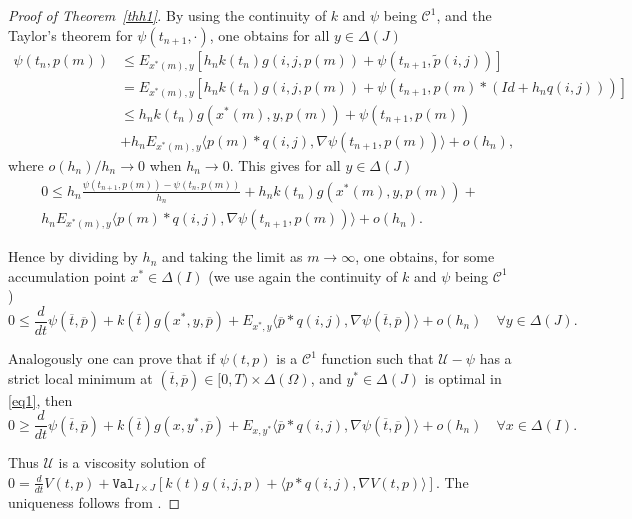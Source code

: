 \documentclass[english,openary,12pt]{article}
\theoremstyle{definition}
\begin{document}
\begin{proof}[Proof of Theorem~\ref{thh1}]
By using the continuity of $k$ and $\psi$ being $\mathcal C^1$, 
and the Taylor's theorem for $\psi(t_{n+1},\cdot)$, one obtains 
for all $y \in \Delta(J)$
\begin{align*}
\psi(t_n,p(m)) &\le E_{x^*(m),y} \left[h_n k(t_n) g(i,j,p(m)) + 
\psi(t_{n+1},\widetilde p(i,j))\right] \\
&= E_{x^*(m),y} \left[h_n k(t_n) g(i,j,p(m)) + 
\psi(t_{n+1},p(m) * (Id + h_n q(i,j)))\right] \\
&\le h_n k(t_n) g(x^*(m),y,p(m)) + \psi(t_{n+1},p(m)) \\
&+ h_n E_{x^*(m),y} \langle p(m) * q(i,j), 
\nabla \psi(t_{n+1},p(m)) \rangle + o(h_n),
\end{align*}
where $o(h_n) / h_n \to 0$ when $h_n \to 0$.
This gives for all $y \in \Delta(J)$\\
\begin{multline*}
  0 \le h_n \frac{\psi(t_{n+1},p(m)) - \psi(t_{n},p(m))}{h_n} 
  + h_n k(t_n) g(x^*(m),y,p(m)) + \\
  h_n E_{x^*(m),y} \langle p(m) * q(i,j), 
  \nabla \psi(t_{n+1},p(m)) \rangle + o(h_n).
\end{multline*}

Hence by dividing by $h_n$ and taking the limit as $m \to \infty$, 
one obtains, for some accumulation point $x^* \in \Delta(I)$ 
(we use again the continuity of $k$ and 
$\psi$ being $\mathcal C^1$)
$$0 \le \frac{d}{dt} \psi(\overline t,\overline p) + 
k(\overline t) g(x^*,y,\overline p) + 
E_{x^*,y} \langle \overline p * q(i,j), 
\nabla \psi(\overline t,\overline p) \rangle + o(h_n) \quad \forall y \in 
\Delta(J).$$

Analogously one can prove that if $\psi(t,p)$ is a $\mathcal C^1$ function 
such that $\mathcal{U} - \psi$ has a strict local minimum at 
$(\overline t, \overline p) \in [0,T) \times \Delta(\Omega)$, and 
$y^* \in \Delta(J)$ is optimal in \eqref{eq1}, then
$$0 \ge \frac{d}{dt} \psi(\overline t,\overline p) + 
k(\overline t) g(x,y^*,\overline p) + 
E_{x,y^*} \langle \overline p * q(i,j), 
\nabla \psi(\overline t,\overline p) \rangle + o(h_n) \quad \forall x \in 
\Delta(I).$$

Thus $\mathcal U$ is a viscosity solution of 
$0 = \frac{d}{dt} V(t,p) + \texttt{Val}_{I \times J} 
[k(t) g(i,j,p) + \langle p * q(i,j), \nabla V(t,p) \rangle].$
The uniqueness follows from \cite[Proposition~3.9]{Sor17}.
\end{proof}
\end{document}
